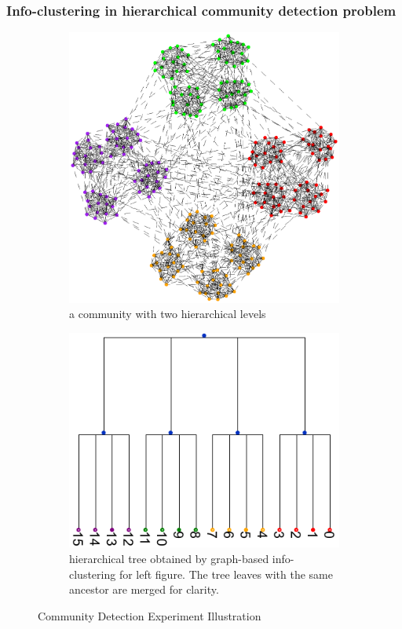 \documentclass[notheorems]{beamer}
\begin{document}
\begin{frame}
\frametitle{Info-clustering in hierarchical community detection problem}
\begin{figure}
	\centering
	\begin{subfigure}{0.45\textwidth}
		\includegraphics[width=\textwidth]{paper/pic/two_level.eps}
		\caption{a community with two hierarchical levels}\label{fig:c1}
	\end{subfigure}
	\begin{subfigure}{0.45\textwidth}
		\includegraphics[width=\textwidth]{paper/pic/tree_info-clustering.pdf}
		\caption{hierarchical tree obtained by graph-based info-clustering for left figure. The tree leaves with the same ancestor are merged for clarity.}\label{fig:c2}
	\end{subfigure}
	\caption{Community Detection Experiment Illustration}
\end{figure}
\end{frame}
\end{document}
